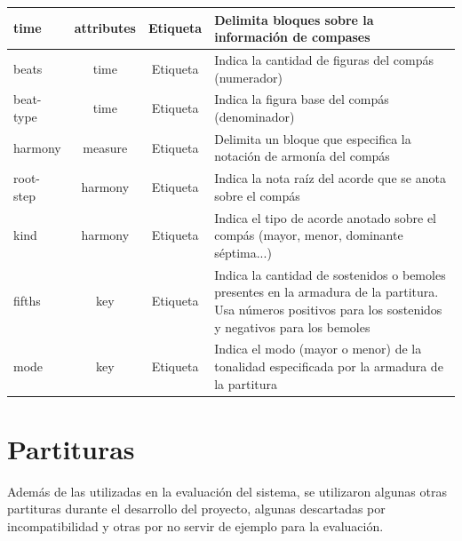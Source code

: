 \begin{center}
\begin{longtable}{ | l | c | c | p{6.5cm} | }
 		time & attributes & Etiqueta & Delimita bloques sobre la información de compases \\ \hline
 		beats & time & Etiqueta & Indica la cantidad de figuras del compás (numerador) \\ \hline
 		beat-type & time & Etiqueta & Indica la figura base del compás (denominador) \\ \hline
 		harmony & measure & Etiqueta & Delimita un bloque que especifica la notación de armonía del compás \\ \hline
 		root-step & harmony & Etiqueta & Indica la nota raíz del acorde que se anota sobre el compás \\ \hline
 		kind & harmony & Etiqueta & Indica el tipo de acorde anotado sobre el compás (mayor, menor, dominante séptima...) \\ \hline
 		fifths & key & Etiqueta & Indica la cantidad de sostenidos o bemoles presentes en la armadura de la partitura. Usa números positivos para los sostenidos y negativos para los bemoles \\ \hline
 		mode & key & Etiqueta & Indica el modo (mayor o menor) de la tonalidad especificada por la armadura de la partitura \\ \hline
 	\end{longtable}
 \end{center} 
 
 \chapter{Partituras}
 \label{chap:scores}
 Además de las utilizadas en la evaluación del sistema, se utilizaron algunas otras partituras durante el desarrollo del proyecto, algunas descartadas por incompatibilidad y otras por no servir de ejemplo para la evaluación.
 
